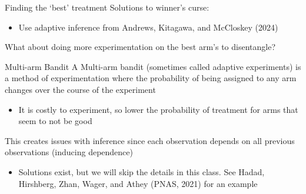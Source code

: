 \documentclass[aspectratio=169,t,11pt,table]{beamer}
\begin{document}
\begin{frame}{Finding the `best' treatment}
	Solutions to winner's curse:
	\begin{itemize}
		\item Use adaptive inference from Andrews, Kitagawa, and McCloskey (2024)
	\end{itemize}

	\bigskip
	What about doing more experimentation on the best arm's to disentangle?
\end{frame}

\begin{frame}{Multi-arm Bandit}
	A \alert{Multi-arm bandit} (sometimes called adaptive experiments) is a method of experimentation where the probability of being assigned to any arm changes over the course of the experiment
	\begin{itemize}
		\item It is costly to experiment, so lower the probability of treatment for arms that seem to not be good
	\end{itemize}

	\pause
	\bigskip
	This creates issues with inference since each observation depends on all previous observations (inducing dependence)
	\begin{itemize}
		\item Solutions exist, but we will skip the details in this class. See Hadad, Hirshberg, Zhan, Wager, and Athey (PNAS, 2021) for an example
	\end{itemize}
\end{frame}


\end{document}
